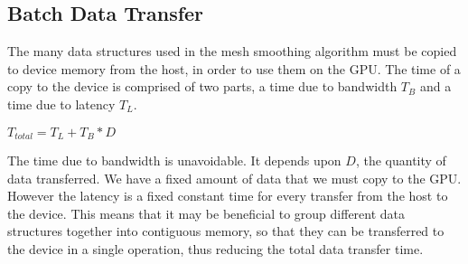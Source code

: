 \subsection*{Batch Data Transfer}
The many data structures used in the mesh smoothing algorithm must be copied to device memory from the host, in order to use them on the GPU. The time of a copy to the device is comprised of two parts, a time due to bandwidth \begin{math}T_B\end{math} and a time due to latency \begin{math}T_L\end{math}\cite{transfer2}.

\begin{math}T_\mathit{total} = T_L + T_B*D\end{math}

The time due to bandwidth is unavoidable. It depends upon \begin{math}D\end{math}, the quantity of data transferred. We have a fixed amount of data that we must copy to the GPU. However the latency is a fixed constant time for every transfer from the host to the device. This means that it may be beneficial to group different data structures together into contiguous memory, so that they can be transferred to the device in a single operation, thus reducing the total data transfer time.